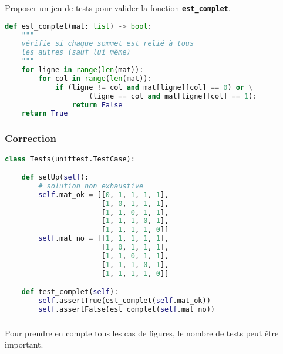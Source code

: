 \documentclass[svgnames,11pt]{beamer}
\begin{document}
\begin{frame}[fragile]
\begin{activite}
Proposer un jeu de tests pour valider la fonction \textbf{\texttt{est\_complet}}.
\end{activite}
    \begin{lstlisting}[language=Python , basicstyle=\ttfamily\small, xleftmargin=0.2em, xrightmargin=-4em]
def est_complet(mat: list) -> bool:
    """
    vérifie si chaque sommet est relié à tous
    les autres (sauf lui même)
    """
    for ligne in range(len(mat)):
        for col in range(len(mat)):
            if (ligne != col and mat[ligne][col] == 0) or \
                    (ligne == col and mat[ligne][col] == 1):
                return False
    return True
\end{lstlisting}

\end{frame}
\begin{frame}[fragile]
    \frametitle{Correction}

\begin{lstlisting}[language=Python , basicstyle=\ttfamily\small, xleftmargin=0.2em, xrightmargin=0em]
class Tests(unittest.TestCase):

    def setUp(self):
        # solution non exhaustive
        self.mat_ok = [[0, 1, 1, 1, 1],
                       [1, 0, 1, 1, 1],
                       [1, 1, 0, 1, 1],
                       [1, 1, 1, 0, 1],
                       [1, 1, 1, 1, 0]]
        self.mat_no = [[1, 1, 1, 1, 1],
                       [1, 0, 1, 1, 1],
                       [1, 1, 0, 1, 1],
                       [1, 1, 1, 0, 1],
                       [1, 1, 1, 1, 0]]

    def test_complet(self):
        self.assertTrue(est_complet(self.mat_ok))
        self.assertFalse(est_complet(self.mat_no))
\end{lstlisting}

\end{frame}
\begin{frame}
    \frametitle{}

    \begin{aretenir}[]
    Pour prendre en compte tous les cas de figures, le nombre de tests peut être important.
    \end{aretenir}
\end{frame}
\end{document}
